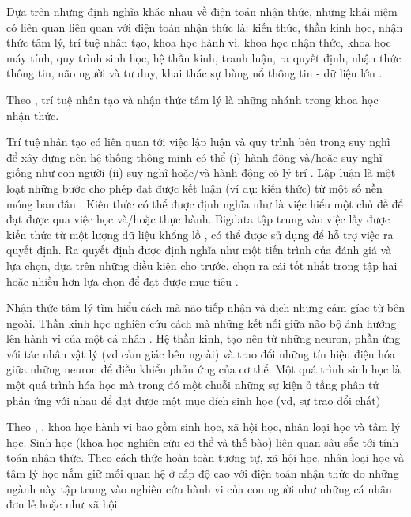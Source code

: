 \documentclass{article}
\begin{document}
Dựa trên những định nghĩa khác nhau về điện toán nhận thức, những khái niệm có liên quan liên quan với điện toán nhận thức là: kiến thức, thần kinh học, nhận thức tâm lý, trí tuệ nhân tạo, khoa học hành vi, khoa học nhận thức, khoa học máy tính, quy trình sinh học, hệ thần kinh, tranh luận, ra quyết định, nhận thức thông tin, não người và tư duy, khai thác sự bùng nổ thông tin - dữ liệu lớn \citep{cuzzocrea2011analytics}.

Theo , trí tuệ nhân tạo và nhận thức tâm lý là những nhánh trong khoa học nhận thức.

Trí tuệ nhân tạo có liên quan tới việc lập luận và quy trình bên trong suy nghĩ để xây dựng nên hệ thống thông minh có thể
(i) hành động và/hoặc suy nghĩ giống như con người 
(ii) suy nghĩ hoặc/và hành động có lý trí \citep{brewka1996artificial}. 
Lập luận là một loạt những bước cho phép đạt được kết luận (ví dụ: kiến thức) từ một số nền móng ban đầu \citep{walton1990reasoning}. Kiến thức có thể được định nghĩa như là việc hiểu một chủ đề để đạt được qua việc học và/hoặc thực hành. Bigdata tập trung vào việc lấy được kiến thức từ một lượng dữ liệu khổng lồ \citep{rubinstein2012big}, có thể được sử dụng để hỗ trợ việc ra quyết định. Ra quyết định được định nghĩa như một tiến trình của đánh giá và lựa chọn, dựa trên những điều kiện cho trước, chọn ra cái tốt nhất trong tập hai hoặc nhiều hơn lựa chọn để đạt được mục tiêu \citep{ozcan2011comparative}.

Nhận thức tâm lý tìm hiểu cách mà não tiếp nhận và dịch những cảm gíac từ bên ngoài. Thần kinh học nghiên cứu cách mà những kết nối giữa não bộ ảnh hưởng lên hành vi của một cá nhân \citep{imam2012digital}. Hệ thần kinh, tạo nên từ những neuron, phần ứng với tác nhân vật lý (vd cảm giác bên ngoài) và trao đổi những tín hiệu điện hóa giữa những neuron để điều khiển phản ứng của cơ thể. Một quá trình sinh học là một quá trình hóa học mà trong đó một chuỗi những sự kiện \citep{saxena2006absolute} ở tầng phân tử phản ứng với nhau để đạt được một mục đích sinh học (vd, sự trao đổi chất) \citep{dennis2003david}

Theo \citet{dwore1981behavioral}, \citet{gintis2004towards}, khoa học hành vi bao gồm sinh học, xã hội học, nhân loại học và tâm lý học. Sinh học (khoa học nghiên cứu cơ thể và thế bào) liên quan sâu sắc tới tính toán nhận thức. Theo cách thức hoàn toàn tương tự, xã hội học, nhân loại học và tâm lý học nắm giữ mối quan hệ ở cấp độ cao với điện toán nhận thức do những ngành này tập trung vào nghiên cứu hành vi của con người như những cá nhân đơn lẻ hoặc như xã hội.
\end{document}
